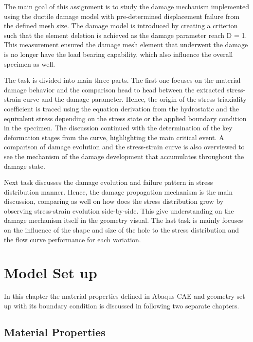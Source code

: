 \documentclass[12pt]{article}
\begin{document}
\hspace{1em}The main goal of this assignment is to study the damage mechanism implemented using the ductile damage model with
pre-determined displacement failure from the defined mesh size. The damage model is introduced by creating a criterion such that the
element deletion is achieved as the damage parameter reach D = 1. This measurement ensured the damage mesh element that underwent the damage is no
longer have the load bearing capability, which also influence the overall specimen as well. 

\hspace{1em}The task is divided into main three parts. The first one focuses on the material damage behavior and the comparison head to head between the
extracted stress-strain curve and the damage parameter. Hence, the origin of the stress triaxiality coefficient is traced using the equation
derivation from the hydrostatic and the equivalent stress depending on the stress state or the applied boundary condition in the specimen. 
The discussion continued with the determination of the key deformation stages from the curve, highlighting the main critical
event. A comparison of damage evolution and the stress-strain curve is also overviewed to see the mechanism of the damage development that accumulates
throughout the damage state.

\hspace{1em}Next task discusses the damage evolution and failure pattern in stress distribution manner. Hence, the damage propagation mechanism
is the main discussion, comparing as well on how does the stress distribution grow by observing stress-strain evolution side-by-side. This give understanding
on the damage mechanism itself in the geometry visual. The last task is mainly focuses on the influence of the shape and size of the hole to the
stress distribution and the flow curve performance for each variation.   



\section{Model Set up}

\hspace{1em} In this chapter the material properties defined in Abaqus CAE and geometry set up with its boundary condition
is discussed in following two separate chapters. 

\subsection{Material Properties}
\end{document}
